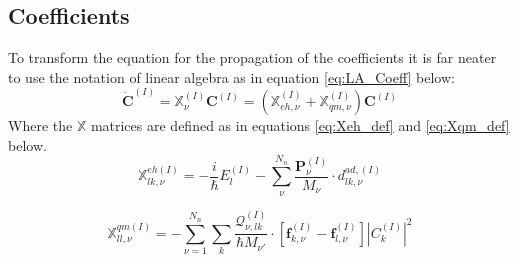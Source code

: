 \subsection{Coefficients}
To transform the equation for the propagation of the coefficients it is far neater to use the notation of linear algebra as in equation \eqref{eq:LA_Coeff} below:
\begin{equation}
	\dot{\mathbf{C}}^{(I)} = \mathbb{X}_{\nu}^{(I)} \mathbf{C}^{(I)} = \left(\mathbb{X}_{eh, \nu}^{(I)} + \mathbb{X}_{qm, \nu}^{(I)}\right) \mathbf{C}^{(I)}
	\label{eq:LA_Coeff}
\end{equation}
Where the $\mathbb{X}$ matrices are defined as in equations \eqref{eq:Xeh_def} and \eqref{eq:Xqm_def} below.
\begin{equation}
  \mathbb{X}_{lk, \nu}^{eh (I)} = -\frac{i}{\hbar} E_{l}^{(I)} - \sum_{\nu}^{N_{n}}\frac{\mathbf{P}_{\nu}^{(I)}}{M_{\nu}} \cdot d_{lk, \nu}^{ad, (I)}
  \label{eq:Xeh_def}
\end{equation}

\begin{equation}
  \mathbb{X}_{ll, \nu}^{qm (I)} = -\sum_{\nu=1}^{N_{n}} \sum_{k} \frac{\mathcal{Q}_{\nu, lk}^{(I)}}{\hbar M_{\nu'}} \cdot \left[ \mathbf{f}_{k, \nu}^{(I)} - \mathbf{f}_{l, \nu}^{(I)} \right]  |C_{k}^{(I)}|^2
  \label{eq:Xqm_def}
\end{equation}

